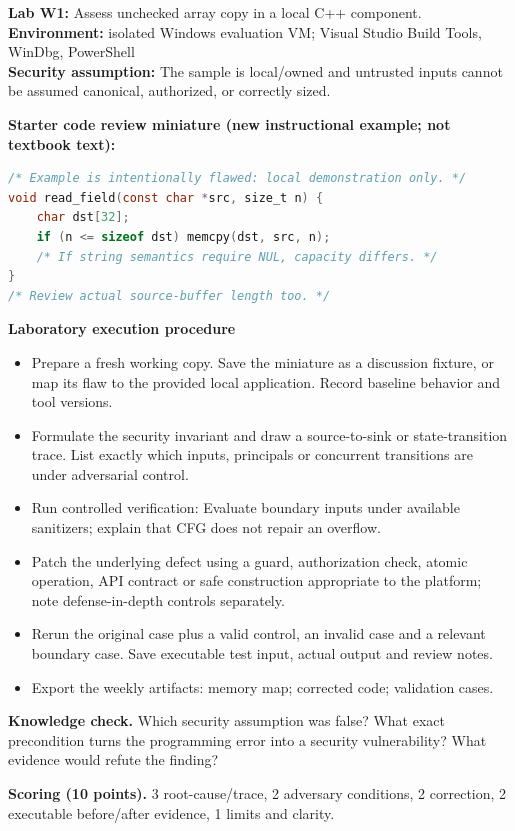 \documentclass[10pt,letterpaper]{article}
\begin{document}
\begin{insight}\textbf{Lab W1:} Assess unchecked array copy in a local C++ component.\\\textbf{Environment:} isolated Windows evaluation VM; Visual Studio Build Tools, WinDbg, PowerShell\\\textbf{Security assumption:} The sample is local/owned and untrusted inputs cannot be assumed canonical, authorized, or correctly sized.\end{insight}
\textbf{Starter code review miniature (new instructional example; not textbook text):}
\begin{lstlisting}[language=C]
/* Example is intentionally flawed: local demonstration only. */
void read_field(const char *src, size_t n) {
    char dst[32];
    if (n <= sizeof dst) memcpy(dst, src, n);
    /* If string semantics require NUL, capacity differs. */
}
/* Review actual source-buffer length too. */
\end{lstlisting}
\textbf{Laboratory execution procedure}
\begin{itemize}[leftmargin=*,itemsep=2pt]
\item Prepare a fresh working copy. Save the miniature as a discussion fixture, or map its flaw to the provided local application. Record baseline behavior and tool versions.
\item Formulate the security invariant and draw a source-to-sink or state-transition trace. List exactly which inputs, principals or concurrent transitions are under adversarial control.
\item Run controlled verification: Evaluate boundary inputs under available sanitizers; explain that CFG does not repair an overflow.
\item Patch the underlying defect using a guard, authorization check, atomic operation, API contract or safe construction appropriate to the platform; note defense-in-depth controls separately.
\item Rerun the original case plus a valid control, an invalid case and a relevant boundary case. Save executable test input, actual output and review notes.
\item Export the weekly artifacts: memory map; corrected code; validation cases.
\end{itemize}
\textbf{Knowledge check.} Which security assumption was false? What exact precondition turns the programming error into a security vulnerability? What evidence would refute the finding?

\textbf{Scoring (10 points).} 3 root-cause/trace, 2 adversary conditions, 2 correction, 2 executable before/after evidence, 1 limits and clarity.
\end{document}
